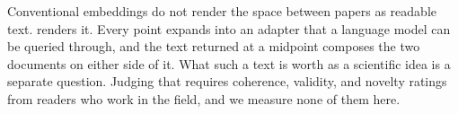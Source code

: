 Conventional embeddings do not render the space between papers as readable text. \doctolora renders it. Every point expands into an adapter that a language model can be queried through, and the text returned at a midpoint composes the two documents on either side of it.
What such a text is worth as a scientific idea is a separate question. Judging that requires coherence, validity, and novelty ratings from readers who work in the field, and we measure none of them here.

